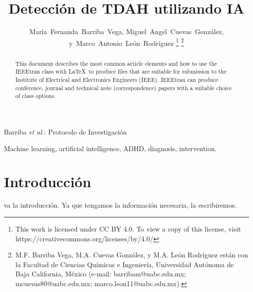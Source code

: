 \documentclass[10pt,journal,compsoc]{IEEEtran}
\begin{document}
\title{Detección de TDAH utilizando IA}

\author{María~Fernanda~Barriba~Vega,
    Miguel~Angel~Cuevas~González,
    y~Marco~Antonio~León~Rodríguez%
    \thanks{This work is licensed under CC BY 4.0. To view a copy of this license, visit https://creativecommons.org/licenses/by/4.0/}%
    \thanks{\indent M.F. Barriba Vega, M.A. Cuevas González, y M.A. León Rodríguez están con la Facultad de Ciencias Químicas e Ingeniería, Universidad Autónoma de Baja California, México (e-mail: barribam@uabc.edu.mx; mcuevas80@uabc.edu.mx; marco.leon11@uabc.edu.mx).}}

%
{Barriba \MakeLowercase{\textit{et al.}}: Protocolo de Investigación}

\maketitle

\begin{abstract}
    This document describes the most common article elements and how to use the IEEEtran class with \LaTeX \ to produce files that are suitable for submission to the Institute of Electrical and Electronics Engineers (IEEE).  IEEEtran can produce conference, journal and technical note (correspondence) papers with a suitable choice of class options.
\end{abstract}

\begin{IEEEkeywords}
    Machine learning, artificial intelligence, ADHD, diagnosis, intervention.
\end{IEEEkeywords}

\section{Introducción}
 va la introducción. Ya que tengamos la información necesaria, la escribiremos.
\end{document}
